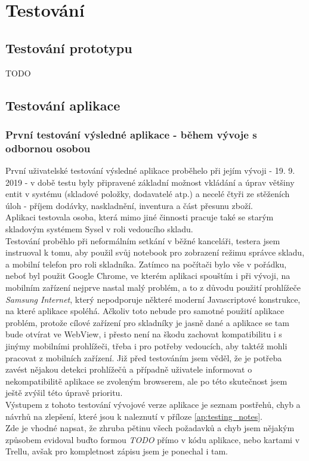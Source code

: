 \chapter{Testování}\label{testing}

\section{Testování prototypu}

TODO

\section{Testování aplikace}

\subsection{První testování výsledné aplikace - během vývoje s odbornou osobou}

První uživatelské testování výsledné aplikace proběhelo při jejím vývoji - 19. 9. 2019 - v době testu byly připravené základní možnost vkládání a úprav většiny entit v systému (skladové položky, dodavatelé atp.) a necelé čtyři ze stěženích úloh - příjem dodávky, naskladnění, inventura a část přesunu zboží.\\
Aplikaci testovala osoba, která mimo jiné činnosti pracuje také se starým skladovým systémem Sysel v roli vedoucího skladu.\\
Testování proběhlo při neformálním setkání v běžné kanceláři, testera jsem instruoval k tomu, aby použil svůj notebook pro zobrazení režimu správce skladu, a mobilní telefon pro roli skladníka. Zatímco na počítači bylo vše v pořádku, neboť byl použit Google Chrome, ve kterém aplikaci spouštím i při vývoji, na mobilním zařízení nejprve nastal malý problém, a to z důvodu použití prohlížeče \emph{Samsung Internet}, který nepodporuje některé moderní Javascriptové konstrukce, na které aplikace spoléhá. Ačkoliv toto nebude pro samotné použití aplikace problém, protože cílové zařízení pro skladníky je jasně dané a aplikace se tam bude otvírat ve WebView, i přesto není na škodu zachovat kompatibilitu i s jinýmy mobilními prohlížeči, třeba i pro potřeby vedoucích, aby taktéž mohli pracovat z mobilních zařízení. Již před testováním jsem věděl, že je potřeba zavést nějakou detekci prohlížečů a případně uživatele informovat o nekompatibilitě aplikace se zvoleným browserem, ale po této skutečnost jsem ještě zvýšil této úpravě prioritu.\\
Výstupem z tohoto testování vývojové verze aplikace je seznam postřehů, chyb a návrhů na zlepšení, které jsou k naleznutí v příloze \ref{ap:testing_notes}.\\
Zde je vhodné napsat, že zhruba pětinu všech požadavků a chyb jsem nějakým způsobem evidoval buďto formou \emph{TODO} přímo v kódu aplikace, nebo kartami v Trellu, avšak pro kompletnost zápisu jsem je ponechal i tam.

